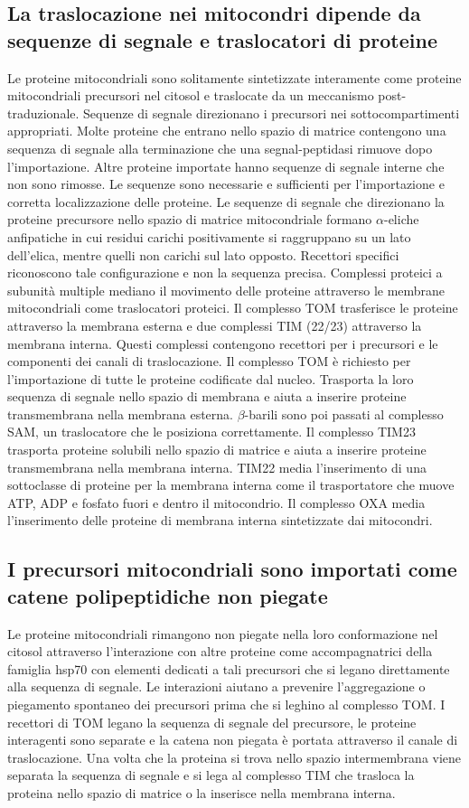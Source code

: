 \subsection{La traslocazione nei mitocondri dipende da sequenze di segnale e traslocatori di proteine}
Le proteine mitocondriali sono solitamente sintetizzate interamente come proteine mitocondriali precursori nel citosol e traslocate da un meccanismo post-traduzionale. Sequenze di 
segnale direzionano i precursori nei sottocompartimenti appropriati. Molte proteine che entrano nello spazio di matrice contengono una sequenza di segnale alla terminazione  
che una segnal-peptidasi rimuove dopo l'importazione. Altre proteine importate hanno sequenze di segnale interne che non sono rimosse. Le sequenze sono necessarie e sufficienti per
l'importazione e corretta localizzazione delle proteine. Le sequenze di segnale che direzionano la proteine precursore nello spazio di matrice mitocondriale formano $\alpha$-eliche
anfipatiche in cui residui carichi positivamente si raggruppano su un lato dell'elica, mentre quelli non carichi sul lato opposto. Recettori specifici riconoscono tale configurazione
e non la sequenza precisa. Complessi proteici a subunit\`a multiple mediano il movimento delle proteine attraverso le membrane mitocondriali come traslocatori proteici. Il complesso TOM 
trasferisce le proteine attraverso la membrana esterna e due complessi TIM (22/23) attraverso la membrana interna. Questi complessi contengono recettori per i precursori e le 
componenti dei canali di traslocazione. Il complesso TOM \`e richiesto per l'importazione di tutte le proteine codificate dal nucleo. Trasporta la loro sequenza di segnale nello 
spazio di membrana e aiuta a inserire proteine transmembrana nella membrana esterna. $\beta$-barili sono poi passati al complesso SAM, un traslocatore che le posiziona correttamente. 
Il complesso TIM23 trasporta proteine solubili nello spazio di matrice e aiuta a inserire proteine transmembrana nella membrana interna. TIM22 media l'inserimento di una sottoclasse
di proteine per la membrana interna come il trasportatore che muove ATP, ADP e fosfato fuori e dentro il mitocondrio. Il complesso OXA media l'inserimento delle proteine di membrana 
interna sintetizzate dai mitocondri.
\subsection{I precursori mitocondriali sono importati come catene polipeptidiche non piegate}
Le proteine mitocondriali rimangono non piegate nella loro conformazione nel citosol attraverso l'interazione con altre proteine come accompagnatrici della famiglia hsp70 con elementi
dedicati a tali precursori che si legano direttamente alla sequenza di segnale. Le interazioni aiutano a prevenire l'aggregazione o piegamento spontaneo dei precursori prima che si
leghino al complesso TOM. I recettori di TOM legano la sequenza di segnale del precursore, le proteine interagenti sono separate e la catena non piegata \`e portata attraverso il 
canale di traslocazione. Una volta che la proteina si trova nello spazio intermembrana viene separata la sequenza di segnale e si lega al complesso TIM che trasloca la proteina nello
spazio di matrice o la inserisce nella membrana interna.
